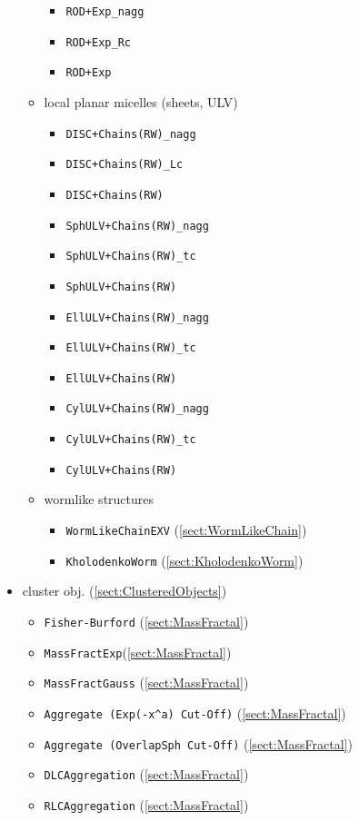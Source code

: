 \begin{itemize}
\begin{itemize}
\begin{itemize}
\item \texttt{ROD+Exp\_nagg}
\item \texttt{ROD+Exp\_Rc}
\item \texttt{ROD+Exp}
\end{itemize}
\item local planar micelles (sheets, ULV)
\begin{itemize}
\item \texttt{DISC+Chains(RW)\_nagg}
\item \texttt{DISC+Chains(RW)\_Lc}
\item \texttt{DISC+Chains(RW)}
\item \texttt{SphULV+Chains(RW)\_nagg}
\item \texttt{SphULV+Chains(RW)\_tc}
\item \texttt{SphULV+Chains(RW)}
\item \texttt{EllULV+Chains(RW)\_nagg}
\item \texttt{EllULV+Chains(RW)\_tc}
\item \texttt{EllULV+Chains(RW)}
\item \texttt{CylULV+Chains(RW)\_nagg}
\item \texttt{CylULV+Chains(RW)\_tc}
\item \texttt{CylULV+Chains(RW)}
\end{itemize}
\item wormlike structures
\begin{itemize}
\item \texttt{WormLikeChainEXV} (\ref{sect:WormLikeChain})
\item \texttt{KholodenkoWorm} (\ref{sect:KholodenkoWorm})
\end{itemize}
\end{itemize}
\item cluster obj. (\ref{sect:ClusteredObjects})
\begin{itemize}
\item \texttt{Fisher-Burford} (\ref{sect:MassFractal})
\item \texttt{MassFractExp}(\ref{sect:MassFractal})
\item \texttt{MassFractGauss} (\ref{sect:MassFractal})
\item \texttt{Aggregate (Exp(-x\^{}a) Cut-Off)} (\ref{sect:MassFractal})
\item \texttt{Aggregate (OverlapSph Cut-Off)} (\ref{sect:MassFractal})
\item \texttt{DLCAggregation} (\ref{sect:MassFractal})
\item \texttt{RLCAggregation} (\ref{sect:MassFractal})

\end{itemize}
\end{itemize}
